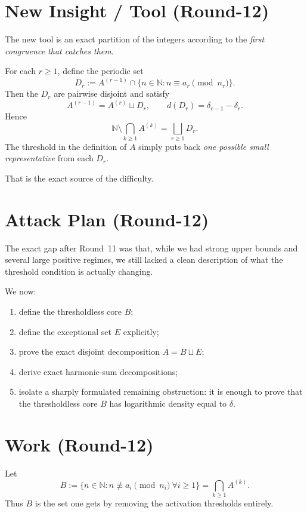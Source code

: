 \section{New Insight / Tool (Round-12)}
The new tool is an exact partition of the integers according to the \emph{first congruence that catches them}.

For each $r\ge 1$, define the periodic set
\begin{equation}
D_r := A^{(r-1)} \cap \{n\in\mathbb N: n\equiv a_r\pmod{n_r}\}.
\tag{12.2}
\end{equation}
Then the $D_r$ are pairwise disjoint and satisfy
\[
A^{(r-1)} = A^{(r)} \sqcup D_r,
\qquad
 d(D_r)=\delta_{r-1}-\delta_r.
\]
Hence
\[
\mathbb N \setminus \bigcap_{k\ge 1} A^{(k)} = \bigsqcup_{r\ge 1} D_r.
\]
The threshold in the definition of $A$ simply puts back \emph{one possible small representative} from each $D_r$.

That is the exact source of the difficulty.

\section{Attack Plan (Round-12)}
The exact gap after Round~11 was that, while we had strong upper bounds and several large positive regimes, we still lacked a clean description of what the threshold condition is actually changing.

We now:
\begin{enumerate}
\item define the thresholdless core $B$;
\item define the exceptional set $E$ explicitly;
\item prove the exact disjoint decomposition $A=B\sqcup E$;
\item derive exact harmonic-sum decompositions;
\item isolate a sharply formulated remaining obstruction: it is enough to prove that the thresholdless core $B$ has logarithmic density equal to $\delta$.
\end{enumerate}

\section{Work (Round-12)}
Let
\begin{equation}
B := \{n\in\mathbb N: n\not\equiv a_i\pmod{n_i}\ \forall i\ge 1\} = \bigcap_{k\ge 1} A^{(k)}.
\tag{12.3}
\end{equation}
Thus $B$ is the set one gets by removing the activation thresholds entirely.

